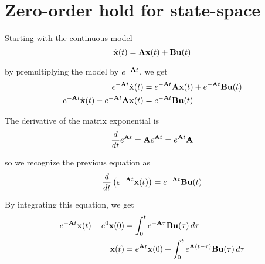 \section{Zero-order hold for state-space}
\label{sec:deriv_zoh_ss}

Starting with the continuous \gls{model}
\begin{equation*}
  \dot{\mathbf{x}}(t) = \mathbf{A}\mathbf{x}(t) + \mathbf{B}\mathbf{u}(t)
\end{equation*}

by premultiplying the \gls{model} by $e^{-\mathbf{A}t}$, we get
\begin{align*}
  e^{-\mathbf{A}t}\dot{\mathbf{x}}(t) &= e^{-\mathbf{A}t}\mathbf{A}\mathbf{x}(t) +
    e^{-\mathbf{A}t}\mathbf{B}\mathbf{u}(t) \\
  e^{-\mathbf{A}t}\dot{\mathbf{x}}(t) - e^{-\mathbf{A}t}\mathbf{A}\mathbf{x}(t) &=
    e^{-\mathbf{A}t}\mathbf{B}\mathbf{u}(t)
\end{align*}

The derivative of the matrix exponential is
\begin{equation*}
  \frac{d}{dt}e^{\mathbf{A}t} = \mathbf{A}e^{\mathbf{A}t} = e^{\mathbf{A}t}\mathbf{A}
\end{equation*}

so we recognize the previous equation as
\begin{equation*}
  \frac{d}{dt}\left(e^{-\mathbf{A}t}\mathbf{x}(t)\right) =
    e^{-\mathbf{A}t}\mathbf{B}\mathbf{u}(t)
\end{equation*}

By integrating this equation, we get
\begin{align*}
  e^{-\mathbf{A}t}\mathbf{x}(t) - e^0\mathbf{x}(0) &=
    \int_0^t e^{-\mathbf{A}\tau}\mathbf{B}\mathbf{u}(\tau) \,d\tau \\
  \mathbf{x}(t) &= e^{\mathbf{A}t}\mathbf{x}(0) +
    \int_0^t e^{\mathbf{A}(t - \tau)}\mathbf{B}\mathbf{u}(\tau) \,d\tau
\end{align*}

